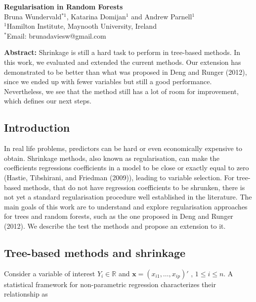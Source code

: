 \documentclass[]{article}
\title{}
\author{}
\date{}
\begin{document}
\begin{center}

    \large \textbf{Regularisation in Random Forests}\\[12pt]

    \normalsize Bruna Wundervald$^{\ast 1}$, Katarina Domijan$^1$ and Andrew Parnell$^1$\\[12pt]
    $^1$Hamilton Institute, Maynooth University, Ireland\\ 
    $^{\ast}$Email: brunadaviesw@gmail.com\\[24pt]
    
\end{center}

\small \textbf{Abstract:} Shrinkage is still a hard task to perform in
tree-based methods. In this work, we evaluated and extended the current
methods. Our extension has demonstrated to be better than what was
proposed in Deng and Runger (2012), since we ended up with fewer
variables but still a good performance. Nevertheless, we see that the
method still has a lot of room for improvement, which defines our next
steps.

\normalsize

\subsection*{Introduction}

In real life problems, predictors can be hard or even economically
expensive to obtain. Shrinkage methods, also known as regularisation,
can make the coefficients regressions coefficients in a model to be
close or exactly equal to zero (Hastie, Tibshirani, and Friedman
(2009)), leading to variable selection. For tree-based methods, that do
not have regression coefficients to be shrunken, there is not yet a
standard regularisation procedure well established in the literature.
The main goals of this work are to understand and explore regularisation
approaches for trees and random forests, such as the one proposed in
Deng and Runger (2012). We describe the test the methods and propose an
extension to it.

\subsection*{Tree-based methods and shrinkage}

Consider a variable of interest \(Y_i \in \mathbb{R}\) and
\(\mathbf{x} = (x_{i1},\dots, x_{ip})'\) , \(1 \leq i \leq n\). A
statistical framework for non-parametric regression characterizes their
relationship as
\end{document}
